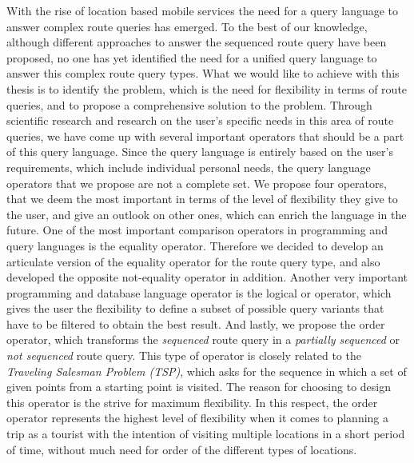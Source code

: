 With the rise of location based mobile services the need for a query language to answer complex route queries has emerged. To the best of our knowledge, although different approaches to answer the sequenced route query have been proposed, no one has yet identified the need for a unified query language to answer this complex route query types. What we would like to achieve with this thesis is to identify the problem, which is the need for flexibility in terms of route queries, and to propose a comprehensive solution to the problem. Through scientific research and research on the user's specific needs in this area of route queries, we have come up with several important operators that should be a part of this query language. Since the query language is entirely based on the user's requirements, which include individual personal needs, the query language operators that we propose are not a complete set. We propose four operators, that we deem the most important in terms of the level of flexibility they give to the user, and give an outlook on other ones, which can enrich the language in the future. \newline
One of the most important comparison operators in programming and query languages is the equality operator. Therefore we decided to develop an articulate version of the equality operator for the route query type, and also developed the opposite not-equality operator in addition. Another very important programming and database language operator is the logical or operator, which gives the user the flexibility to define a subset of possible query variants that have to be filtered to obtain the best result. And lastly, we propose the order operator, which transforms the \textit{sequenced} route query in a \textit{partially sequenced} or \textit{not sequenced} route query. This type of operator is closely related to the \textit{Traveling Salesman Problem (TSP)}, which asks for the sequence in which a set of given points from a starting point is visited. The reason for choosing to design this operator is the strive for maximum flexibility. In this respect, the order operator represents the highest level of flexibility when it comes to planning a trip as a tourist with the intention of visiting multiple locations in a short period of time, without much need for order of the different types of locations.

